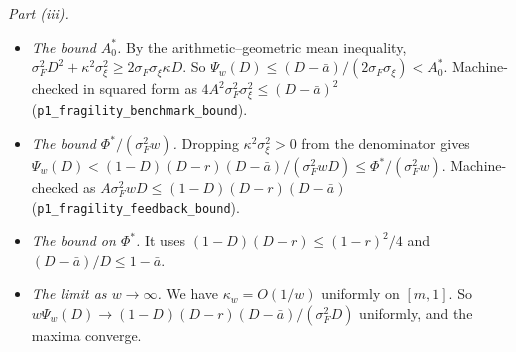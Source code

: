 \documentclass[12pt]{article}
\theoremstyle{definition}
\theoremstyle{remark}
\begin{document}
\emph{Part (iii).}
\begin{itemize}[itemsep=1pt,topsep=2pt]
\item \emph{The bound $A^*_0$.} By the arithmetic--geometric mean inequality, $\sigma_F^2D^2+\kappa^2\sigma_\xi^2\ge2\sigma_F\sigma_\xi\kappa D$. So $\Psi_w(D)\le(D-\bar a)/(2\sigma_F\sigma_\xi)<A^*_0$. Machine-checked in squared form as $4A^2\sigma_F^2\sigma_\xi^2\le(D-\bar a)^2$ (\nolinkurl{p1_fragility_benchmark_bound}).
\item \emph{The bound $\Phi^*/(\sigma_F^2w)$.} Dropping $\kappa^2\sigma_\xi^2>0$ from the denominator gives $\Psi_w(D)<(1-D)(D-r)(D-\bar a)/(\sigma_F^2wD)\le\Phi^*/(\sigma_F^2w)$. Machine-checked as $A\sigma_F^2wD\le(1-D)(D-r)(D-\bar a)$ (\nolinkurl{p1_fragility_feedback_bound}).
\item \emph{The bound on $\Phi^*$.} It uses $(1-D)(D-r)\le(1-r)^2/4$ and $(D-\bar a)/D\le1-\bar a$.
\item \emph{The limit as $w\to\infty$.} We have $\kappa_w=O(1/w)$ uniformly on $[m,1]$. So $w\Psi_w(D)\to(1-D)(D-r)(D-\bar a)/(\sigma_F^2D)$ uniformly, and the maxima converge.
\end{itemize}
\end{document}

